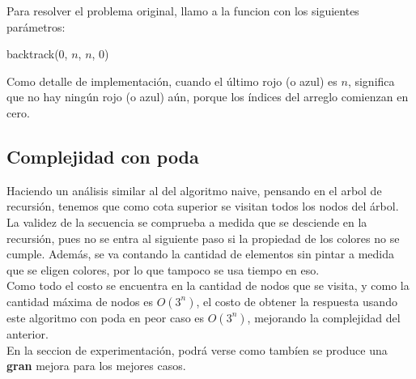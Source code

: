 Para resolver el problema original, llamo a la funcion con los siguientes parámetros:

\begin{algorithm}[H]
\begin{algorithmic}
  \State backtrack($0$, $n$, $n$, $0$)
\EndProcedure
\end{algorithmic}
\end{algorithm}

Como detalle de implementación, cuando el último rojo (o azul) es $n$, significa que no hay ningún rojo (o azul) aún, porque los índices del arreglo comienzan en cero.

\subsection{Complejidad con poda}

Haciendo un análisis similar al del algoritmo naive, pensando en el arbol de recursión, tenemos que como cota superior se visitan todos los nodos del árbol. La validez de la secuencia se comprueba a medida que se desciende en la recursión, pues no se entra al siguiente paso si la propiedad de los colores no se cumple. Además, se va contando la cantidad de elementos sin pintar a medida que se eligen colores, por lo que tampoco se usa tiempo en eso. \\

Como todo el costo se encuentra en la cantidad de nodos que se visita, y como la cantidad máxima de nodos es $O(3^{n})$, el costo de obtener la respuesta usando este algoritmo con poda en peor caso es $O(3^n)$, mejorando la complejidad del anterior. \\ 

En la seccion de experimentación, podrá verse como tambíen se produce una \textbf{gran} mejora para los mejores casos. \\ 
